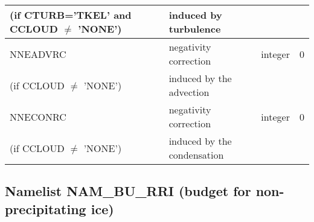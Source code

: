 \begin{longtable} {|p{}|p{}|>{\centering}p{}|p{}<{\centering}|}
(if CTURB='TKEL' and CCLOUD $\neq$ 'NONE')   &induced by turbulence   &       &   \\\hline
NNEADVRC  & negativity correction  & integer  &  0 \index{NNEADVRC!\innam{NAM\_BU\_RRC}}\\ \nopagebreak
(if CCLOUD $\neq$ 'NONE') & induced by the advection&   &  \\\hline
NNECONRC  &negativity correction    & integer  &  0 \index{NNECONRC!\innam{NAM\_BU\_RRC}}\\ \nopagebreak
(if CCLOUD $\neq$ 'NONE') &induced by the condensation &   &  \\\hline
\end{longtable}

\subsection{Namelist NAM\_BU\_RRI (budget for non-precipitating ice)}
